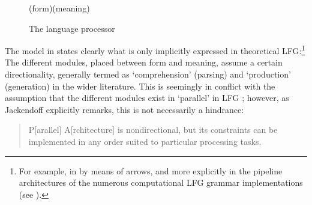 \documentclass[output=paper,hidelinks]{langscibook}
\begin{document}
\begin{figure}
\footnotesize
\noindent ({\sc form})\hfill({\sc meaning})\\
\caption{The language processor \citep[cf.][197, modified]{jackendoff2002foundations}}
\label{fig:Jack}

\end{figure}

The model in  states clearly what is only implicitly expressed in theoretical LFG:\footnote{For example, in  by means of arrows, and more explicitly in the pipeline architectures of the numerous computational LFG grammar implementations (see ).}
The different modules, placed between {\sc form} and {\sc meaning}, assume a certain directionality, generally termed as `comprehension' (parsing) and `production' (generation) in the wider literature. This is seemingly in conflict with the assumption that the different modules exist in `parallel' in LFG \citep[265]{DLM:LFG}; however, as Jackendoff explicitly remarks, this is not necessarily a hindrance:

\begin{quote}P[arallel] A[rchitecture] is nondirectional, but its constraints can be implemented in any order suited to particular processing tasks. \citep[589]{Jackendoff2010a}\end{quote}
\end{document}
